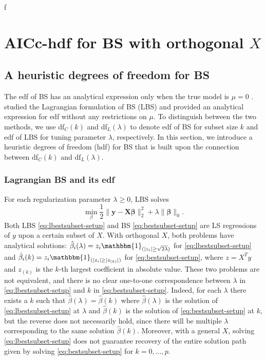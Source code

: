 ƒ%
\section{AICc-hdf for BS with orthogonal \texorpdfstring{$X$}{Lg}}
\label{sec:aicc_hdf}
\subsection{A heuristic degrees of freedom for BS}
The edf of BS has an analytical expression only when the true model is $\mu=0$ \citep{Ye1998}. \citet{Tibshirani2015} studied the Lagrangian formulation of BS (LBS) and provided an analytical expression for edf without any restrictions on $\mu$. To distinguish between the two methods, we use df$_C(k)$ and df$_L(\lambda)$ to denote edf of BS for subset size $k$ and edf of LBS for tuning parameter $\lambda$, respectively. In this section, we introduce a heuristic degrees of freedom (hdf) for BS that is built upon the connection between df$_C(k)$ and df$_L(\lambda)$.

\subsubsection{Lagrangian BS and its edf}
For each regularization parameter $\lambda \ge 0$, LBS solves
\begin{equation}
	\min_\beta \frac{1}{2} \lVert \mathbf{y}-\mathbf{X\beta}\rVert_2^2 + \lambda\lVert \mathbf{\beta} \rVert_0.
\label{eq:lbestsubset-setup}
\end{equation} 
Both LBS \eqref{eq:lbestsubset-setup} and BS \eqref{eq:bestsubset-setup} are LS regressions of $y$ upon a certain subset of $X$. With orthogonal $X$, both problems have analytical solutions: $\hat{\beta}_i(\lambda)=z_i \mathbbm{1}_{(|z_{i}| \ge \sqrt{2\lambda})}$ for \eqref{eq:lbestsubset-setup} and $\hat{\beta}_i(k)=z_i \mathbbm{1}_{(|z_{i}| \ge |z_{(k)}|)}$ for \eqref{eq:bestsubset-setup}, where $z=X^T y$ and $z_{(k)}$ is the $k$-th largest coefficient in absolute value. These two problems are not equivalent, and there is no clear one-to-one correspondence between $\lambda$ in \eqref{eq:lbestsubset-setup} and $k$ in \eqref{eq:bestsubset-setup}. Indeed, for each $\lambda$ there exists a $k$ such that $\hat{\beta}(\lambda) = \hat{\beta}(k)$ where $\hat{\beta}(\lambda)$ is the solution of \eqref{eq:lbestsubset-setup} at $\lambda$ and $\hat{\beta}(k)$ is the solution of \eqref{eq:bestsubset-setup} at $k$, but the reverse does not necessarily hold, since there will be multiple $\lambda$ corresponding to the same solution $\hat{\beta}(k)$. Moreover, with a general $X$, solving \eqref{eq:lbestsubset-setup} does not guarantee recovery of the entire solution path given by solving \eqref{eq:bestsubset-setup} for $k=0,\dots,p$.


